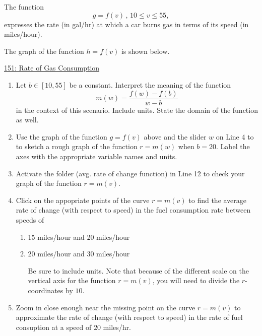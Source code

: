 \documentclass{ximera}
\begin{document}
\begin{question}  \label{Q4gdfetdsfsdfhfg4tr4}
The function
\[
      g = f(v)  \, , \, 10\leq v \leq 55 ,                     %
\]
expresses the rate (in gal/hr) at which a car burns gas in terms of its speed (in miles/hour).

The graph of the function $h=f(v)$ is shown below.

\begin{onlineOnly}
    \begin{center}
\end{center}
\end{onlineOnly}

\href{https://www.desmos.com/calculator/3ubcc1x8kh}{151: Rate of Gas Consumption}

\begin{enumerate}

\item Let $b\in [10,55]$ be a constant. Interpret the meaning of the function
\[
   m(w) =  \frac{f(w)-f(b)}{w-b}
\]
in the context of this scenario. Include units. State the domain of the function as well.

\item Use the graph of the function $g=f(v)$ above and the slider $w$ on Line 4 to to sketch a rough graph of the function $r=m(w)$ when $b=20$. Label the axes with the appropriate variable names and units.

\item Activate the folder (avg. rate of change function) in Line 12 to check your graph of the function $r=m(v)$. 

\item Click on the appopriate points of the curve $r=m(v)$ to find the average rate of change (with respect to speed) in the fuel consumption rate between speeds of  

\begin{enumerate}
\item 15 miles/hour and 20 miles/hour

\item 20 miles/hour and 30 miles/hour

Be sure to include units. Note that because of the different  scale on the vertical axis for the function $r=m(v)$, you will need to divide the $r$-coordinates by $10$.

\end{enumerate}

\item Zoom in close enough near the missing point on the curve $r=m(v)$ to approximate the rate of change (with respect to speed) in the rate of fuel consuption at a speed of $20$ miles/hr.


\end{enumerate}
\end{question}
\end{document}
